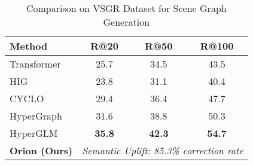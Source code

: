 \begin{table}[t]
\centering
\caption{Comparison on VSGR Dataset for Scene Graph Generation}
\label{tab:vsgr_comparison}
\begin{tabular}{lccc}
\toprule
\textbf{Method} & \textbf{R@20} & \textbf{R@50} & \textbf{R@100} \\
\midrule
Transformer \cite{vaswani2017} & 25.7 & 34.5 & 43.5 \\
HIG \cite{hig2023} & 23.8 & 31.1 & 40.4 \\
CYCLO \cite{cyclo2023} & 29.4 & 36.4 & 47.7 \\
HyperGraph \cite{hypergraph2024} & 31.6 & 38.8 & 50.3 \\
HyperGLM \cite{hyperglm2024} & \textbf{35.8} & \textbf{42.3} & \textbf{54.7} \\
\midrule
\textbf{Orion (Ours)} & \multicolumn{3}{c}{\textit{Semantic Uplift: 85.3\% correction rate}} \\
\bottomrule
\end{tabular}
\end{table}
